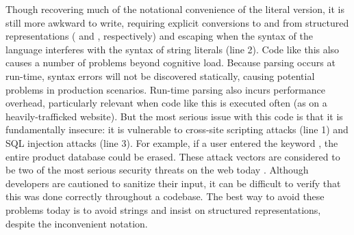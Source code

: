 Though recovering much of the notational convenience of the literal version, it is still more awkward to write, requiring explicit conversions to and from structured representations ( and , respectively) and escaping when the syntax of the language interferes with the syntax of string literals (line 2). Code like this also causes a number of problems beyond cognitive load. Because parsing occurs at run-time, syntax errors will not be discovered statically, causing potential problems in production scenarios. Run-time parsing also incurs performance overhead, particularly relevant when code like this is executed often (as on a heavily-trafficked website). But the most serious issue with this code is that it is fundamentally insecure: it is vulnerable to cross-site scripting attacks (line 1) and SQL injection attacks (line 3). For example, if a user entered the keyword , the entire product database could be erased. These attack vectors are considered to be two of the most serious security threats on the web today \cite{owasp2013}. Although developers are cautioned to sanitize their input, it can be difficult to verify that this was done correctly throughout a codebase. The best way to avoid these problems today is to avoid strings and insist on structured representations, despite the inconvenient notation.

